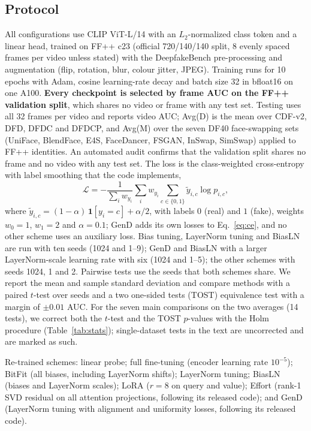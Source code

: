 \documentclass[fonts]{icst}
\begin{document}
\subsection{Protocol}
\label{sec:protocol}
All configurations use CLIP ViT-L/14 with an $L_2$-normalized class token and a linear head, trained on FF++ c23 (official 720/140/140 split, 8 evenly spaced frames per video unless stated) with the DeepfakeBench pre-processing and augmentation (flip, rotation, blur, colour jitter, JPEG). Training runs for 10 epochs with Adam, cosine learning-rate decay and batch size 32 in bfloat16 on one A100. \textbf{Every checkpoint is selected by frame AUC on the FF++ validation split}, which shares no video or frame with any test set. Testing uses all 32 frames per video and reports video AUC; Avg(D) is the mean over CDF-v2, DFD, DFDC and DFDCP, and Avg(M) over the seven DF40 face-swapping sets (UniFace, BlendFace, E4S, FaceDancer, FSGAN, InSwap, SimSwap) applied to FF++ identities. An automated audit confirms that the validation split shares no frame and no video with any test set. The loss is the class-weighted cross-entropy with label smoothing that the code implements,
\begin{equation}
\mathcal{L}=-\frac{1}{\sum_i w_{y_i}}\sum_{i} w_{y_i}\sum_{c\in\{0,1\}}\tilde{y}_{i,c}\log p_{i,c},
\label{eq:ce}
\end{equation}
where $\tilde{y}_{i,c}=(1-\alpha)\,\mathbf{1}[y_i=c]+\alpha/2$, with labels $0$ (real) and $1$ (fake), weights $w_0=1$, $w_1=2$ and $\alpha=0.1$; GenD adds its own losses to Eq.~\eqref{eq:ce}, and no other scheme uses an auxiliary loss. Bias tuning, LayerNorm tuning and BiasLN are run with ten seeds (1024 and 1--9); GenD and BiasLN with a larger LayerNorm-scale learning rate with six (1024 and 1--5); the other schemes with seeds 1024, 1 and 2. Pairwise tests use the seeds that both schemes share. We report the mean and sample standard deviation and compare methods with a paired $t$-test over seeds and a two one-sided tests (TOST) equivalence test with a margin of $\pm0.01$ AUC. For the seven main comparisons on the two averages (14 tests), we correct both the $t$-test and the TOST $p$-values with the Holm procedure (Table~\ref{tab:stats}); single-dataset tests in the text are uncorrected and are marked as such.

Re-trained schemes: linear probe; full fine-tuning (encoder learning rate $10^{-5}$); BitFit (all biases, including LayerNorm shifts); LayerNorm tuning; BiasLN (biases and LayerNorm scales); LoRA ($r{=}8$ on query and value); Effort (rank-1 SVD residual on all attention projections, following its released code); and GenD (LayerNorm tuning with alignment and uniformity losses, following its released code).
\end{document}
